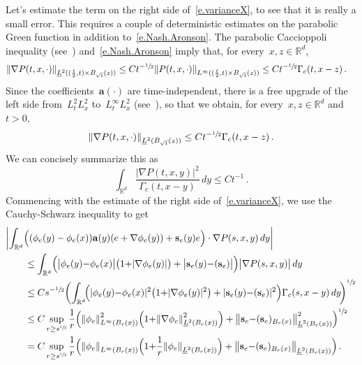\documentclass[11pt]{article} %
\numberwithin{equation}{section}
\theoremstyle{definition}
\let\originalleft\left
\let\originalright\right
\renewcommand{\left}{\mathopen{}\mathclose\bgroup\originalleft}
\renewcommand{\right}{\aftergroup\egroup\originalright}
\newcommand*{\Rd}{\ensuremath{\mathbb{R}^d}}
\renewcommand{\a}{\mathbf{a}}
\begin{document}
Let's estimate the term on the right side of~\eqref{e.varianceX}, to see that it is really a small error. 
This requires a couple of deterministic estimates on the parabolic Green function in addition to~\eqref{e.Nash.Aronson}.
The parabolic Caccioppoli inequality (see~\cite[Lemma 8.1]{AKMBook}) and~\eqref{e.Nash.Aronson} imply that, for every~$x,z\in\Rd$, 
\begin{align*}
\left\| \nabla P(t,x,\cdot) \right\|_{\underline{L}^2((\frac t2,t) \times B_{\sqrt{t}}(z))}
&
\leq 
Ct^{-\sfrac12} 
\left\| P(t,x,\cdot) \right\|_{L^\infty((\frac t2,t)\times B_{\sqrt{t}}(z))}
\leq
C t^{-\sfrac12}  \Gamma_c (t,x-z) 
\,.
\end{align*}
Since the coefficients~$\a(\cdot)$ are time-independent, there is a free upgrade of the left side from~$L^2_tL^2_x$ to~$L^\infty_tL^2_x$ (see~\cite[Lemma 8.2]{AKMBook}), so that we obtain, for every~$x,z\in\Rd$ and~$t>0$, 
\begin{equation}
\label{e.quenchednablaP}
\left\| \nabla P(t,x,\cdot) \right\|_{\underline{L}^2(B_{\sqrt{t}}(z))}
\leq
C t^{-\sfrac12}  \Gamma_c (t,x-z) 
\,.
\end{equation}
We can concisely summarize this as 
\begin{equation}
\label{e.concise.nablaGF}
\int_{\Rd} 
\frac{\bigl| \nabla P(t,x,y) \bigr|^2}
{ \Gamma_c(t,x-y) }
\, dy
\leq Ct^{-1} 
\,.
\end{equation}
Commencing with the estimate of the right side of~\eqref{e.varianceX}, we use the Cauchy-Schwarz inequality to get
\begin{align*}
\lefteqn{ 
\biggl| \int_{\Rd}   
\Bigl( ( \phi_e(y) - \phi_e(x) )
\a(y)(e+\nabla \phi_{e}(y)) 
+ 
\mathbf{s}_e (y) e\Bigr)\cdot
\nabla P(s ,x,y)\,dy
\biggr| 
}
\qquad & 
\\ & 
\leq
\int_{\Rd}   
\Bigl( \bigl|  \phi_e(y)  {-}  \phi_e(x)  \bigr| 
\bigl( 1 {+} |\nabla \phi_{e}(y)| \bigr)  
+ 
\bigl| \mathbf{s}_e (y) {-} (\mathbf{s}_e) \bigr| \Bigr)
\bigl| \nabla P(s ,x,y) \bigr| \,dy
\\ & 
\leq 
Cs^{-\sfrac12} 
\biggl( \int_{\Rd} \!  
\Bigl(  |  \phi_e(y) {-} \phi_e(x)   |^2 
\bigl( 1 {+} |\nabla \phi_{e}(y)|^2 \bigr)  
+ 
 | \mathbf{s}_e (y) {-} (\mathbf{s}_e)  |^2 \Bigr) \Gamma_c (s,x-y)\,dy 
\! \biggr)^{\sfrac12} 
\notag \\ & 
\leq
C 
\sup_{r \geq {s}^{\sfrac12}} 
\frac1{r} 
\Bigl( 
\left\| \phi_e \right\|_{L^\infty(B_{r}(x))}^2
\Bigl( 1 {+} 
\left\| \nabla \phi_e \right\|_{\underline{L}^2(B_{r}(x))}^2
\Bigr) 
+ \left\| \mathbf{s}_e {-} (\mathbf{s}_e)_{B_r(x)} \right\|_{\underline{L}^2(B_{r}(x))}^2
\Bigr)^{\sfrac12} 
\notag \\ & 
=
C 
\sup_{r \geq {s}^{\sfrac12}} 
\frac1{r} 
\Bigl( 
\left\| \phi_e \right\|_{L^\infty(B_{r}(x))}
\Bigl( 1 {+} 
\frac1{r} 
\left\| \phi_e \right\|_{\underline{L}^2(B_{r}(x))}
\Bigr) 
+ \left\| \mathbf{s}_e {-} (\mathbf{s}_e)_{B_r(x)} \right\|_{\underline{L}^2(B_{r}(x))}
\Bigr)
\,.
\end{align*}
\end{document}
